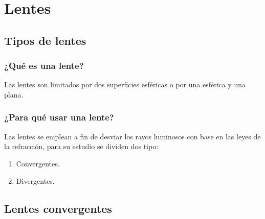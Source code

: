 \documentclass[14pt]{beamer}
\begin{document}
\section{Lentes}
\subsection{Tipos de lentes}

\begin{frame}
\frametitle{¿Qué es una lente?}
Las lentes son  limitados por dos superficies esféricas o por una esférica y una plana.
\end{frame}
\begin{frame}
\frametitle{¿Para qué usar una lente?}
Las lentes se emplean a fin de desviar los rayos luminosos con base en las leyes de la refracción, para su estudio se dividen dos tipo:
\begin{enumerate}[<+->]
\item Convergentes.
\item Divergentes.
\end{enumerate}
\end{frame}

\subsection{Lentes convergentes}
\end{document}
